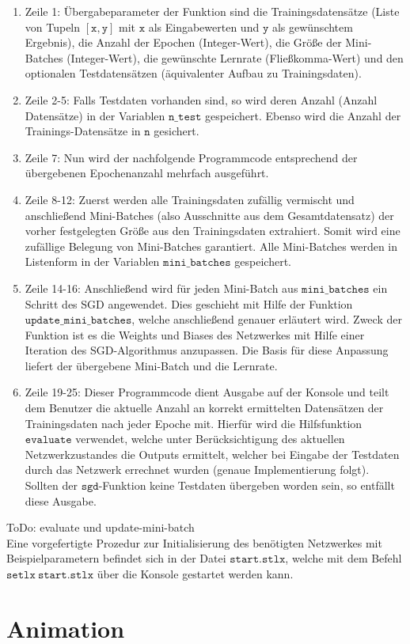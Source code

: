 \begin{enumerate}
\item Zeile 1: Übergabeparameter der Funktion sind die Trainingsdatensätze (Liste von Tupeln $\mathtt{[x,y]}$ mit $\mathtt{x}$ als Eingabewerten und $\mathtt{y}$ als gewünschtem Ergebnis), die Anzahl der Epochen (Integer-Wert), die Größe der Mini-Batches (Integer-Wert), die gewünschte Lernrate (Fließkomma-Wert) und den optionalen Testdatensätzen (äquivalenter Aufbau zu Trainingsdaten).
\item Zeile 2-5: Falls Testdaten vorhanden sind, so wird deren Anzahl (Anzahl Datensätze) in der Variablen $\mathtt{n\_test}$ gespeichert. Ebenso wird die Anzahl der Trainings-Datensätze in $\mathtt{n}$ gesichert.
\item Zeile 7: Nun wird der nachfolgende Programmcode entsprechend der übergebenen Epochenanzahl mehrfach ausgeführt.
\item Zeile 8-12: Zuerst werden alle Trainingsdaten zufällig vermischt und anschließend Mini-Batches (also Ausschnitte aus dem Gesamtdatensatz) der vorher festgelegten Größe aus den Trainingsdaten extrahiert. Somit wird eine zufällige Belegung von Mini-Batches garantiert. Alle Mini-Batches werden in Listenform in der Variablen $\mathtt{mini\_batches}$ gespeichert.
\item Zeile 14-16: Anschließend wird für jeden Mini-Batch aus $\mathtt{mini\_batches}$ ein Schritt des SGD angewendet. Dies geschieht mit Hilfe der Funktion $\mathtt{update\_mini\_batches}$, welche anschließend genauer erläutert wird. Zweck der Funktion ist es die Weights und Biases des Netzwerkes mit Hilfe einer Iteration des SGD-Algorithmus anzupassen. Die Basis für diese Anpassung liefert der übergebene Mini-Batch und die Lernrate.
\item Zeile 19-25: Dieser Programmcode dient Ausgabe auf der Konsole und teilt dem Benutzer die aktuelle Anzahl an korrekt ermittelten Datensätzen der Trainingsdaten nach jeder Epoche mit. Hierfür wird die Hilfsfunktion $\mathtt{evaluate}$ verwendet, welche unter Berücksichtigung des aktuellen Netzwerkzustandes die Outputs ermittelt, welcher bei Eingabe der Testdaten durch das Netzwerk errechnet wurden (genaue Implementierung folgt). Sollten der $\mathtt{sgd}$-Funktion keine Testdaten übergeben worden sein, so entfällt diese Ausgabe.
\end{enumerate}

\noindent
ToDo: evaluate und update-mini-batch \\

\noindent
Eine vorgefertigte Prozedur zur Initialisierung des benötigten Netzwerkes mit Beispielparametern befindet sich in der Datei $\mathtt{start.stlx}$, welche mit dem Befehl $\mathtt{setlx\ start.stlx}$ über die Konsole gestartet werden kann.

\section{Animation}